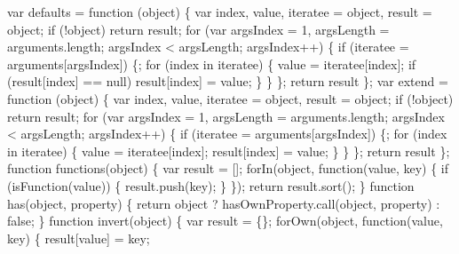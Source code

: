 \begin{DoxyCodeInclude}
{{\textcolor{stringliteral}{  var defaults = function (object) \{}
\textcolor{stringliteral}{    var index, value, iteratee = object, result = object;}
\textcolor{stringliteral}{    if (!object) return result;}
\textcolor{stringliteral}{    for (var argsIndex = 1, argsLength = arguments.length; argsIndex < argsLength; argsIndex++) \{}
\textcolor{stringliteral}{      if (iteratee = arguments[argsIndex]) \{;}
\textcolor{stringliteral}{    }
\textcolor{stringliteral}{      for (index in iteratee) \{}
\textcolor{stringliteral}{        value = iteratee[index];}
\textcolor{stringliteral}{        if (result[index] == null) result[index] = value;    }
\textcolor{stringliteral}{      \}    }
\textcolor{stringliteral}{      \}}
\textcolor{stringliteral}{    \};}
\textcolor{stringliteral}{    return result}
\textcolor{stringliteral}{  \};}
\textcolor{stringliteral}{}
\textcolor{stringliteral}{  var extend = function (object) \{}
\textcolor{stringliteral}{    var index, value, iteratee = object, result = object;}
\textcolor{stringliteral}{    if (!object) return result;}
\textcolor{stringliteral}{    for (var argsIndex = 1, argsLength = arguments.length; argsIndex < argsLength; argsIndex++) \{}
\textcolor{stringliteral}{      if (iteratee = arguments[argsIndex]) \{;}
\textcolor{stringliteral}{    }
\textcolor{stringliteral}{      for (index in iteratee) \{}
\textcolor{stringliteral}{        value = iteratee[index];}
\textcolor{stringliteral}{        result[index] = value;    }
\textcolor{stringliteral}{      \}    }
\textcolor{stringliteral}{      \}}
\textcolor{stringliteral}{    \};}
\textcolor{stringliteral}{    return result}
\textcolor{stringliteral}{  \};}
\textcolor{stringliteral}{}
\textcolor{stringliteral}{  function functions(object) \{}
\textcolor{stringliteral}{    var result = [];}
\textcolor{stringliteral}{    forIn(object, function(value, key) \{}
\textcolor{stringliteral}{      if (isFunction(value)) \{}
\textcolor{stringliteral}{        result.push(key);}
\textcolor{stringliteral}{      \}}
\textcolor{stringliteral}{    \});}
\textcolor{stringliteral}{    return result.sort();}
\textcolor{stringliteral}{  \}}
\textcolor{stringliteral}{}
\textcolor{stringliteral}{  function has(object, property) \{}
\textcolor{stringliteral}{    return object ? hasOwnProperty.call(object, property) : false;}
\textcolor{stringliteral}{  \}}
\textcolor{stringliteral}{}
\textcolor{stringliteral}{  function invert(object) \{}
\textcolor{stringliteral}{    var result = \{\};}
\textcolor{stringliteral}{    forOwn(object, function(value, key) \{}
\textcolor{stringliteral}{      result[value] = key;}
}}
\end{DoxyCodeInclude}
